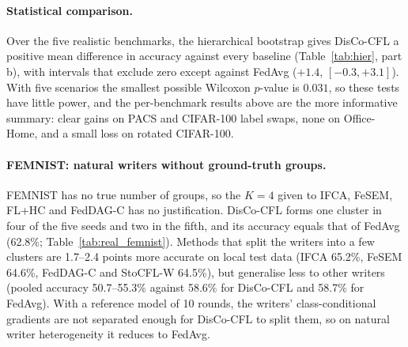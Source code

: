 \paragraph{Statistical comparison.} Over the five realistic benchmarks, the hierarchical bootstrap gives DisCo-CFL a positive mean difference in accuracy against every baseline (Table~\ref{tab:hier}, part b), with intervals that exclude zero except against FedAvg ($+1.4$, $[-0.3,+3.1]$). With five scenarios the smallest possible Wilcoxon $p$-value is $0.031$, so these tests have little power, and the per-benchmark results above are the more informative summary: clear gains on PACS and CIFAR-100 label swaps, none on Office-Home, and a small loss on rotated CIFAR-100.

\paragraph{FEMNIST: natural writers without ground-truth groups.} FEMNIST has no true number of groups, so the $K=4$ given to IFCA, FeSEM, FL+HC and FedDAG-C has no justification. DisCo-CFL forms one cluster in four of the five seeds and two in the fifth, and its accuracy equals that of FedAvg (62.8\%; Table~\ref{tab:real_femnist}). Methods that split the writers into a few clusters are 1.7--2.4 points more accurate on local test data (IFCA 65.2\%, FeSEM 64.6\%, FedDAG-C and StoCFL-W 64.5\%), but generalise less to other writers (pooled accuracy 50.7--55.3\% against 58.6\% for DisCo-CFL and 58.7\% for FedAvg). With a reference model of 10 rounds, the writers' class-conditional gradients are not separated enough for DisCo-CFL to split them, so on natural writer heterogeneity it reduces to FedAvg.

\begin{table}[!htbp]
\centering
\caption{FEMNIST, 100 writers, 5 seeds. Pooled: accuracy on the pooled test sets of 20 writers. IFCA, FeSEM, FL+HC and FedDAG-C receive $K=4$.}\label{tab:real_femnist}

\end{table}
